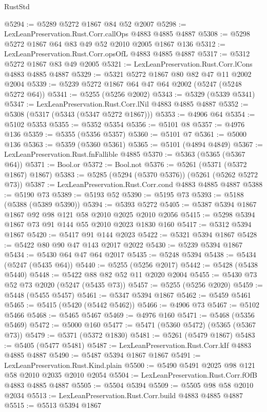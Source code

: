 \begin{lexlean}{RustStd}
\begin{coremodule}
@5294 := @5289 @5272 @1867 @84 @52 @2007
@5298 := LexLeanPreservation.Rust.Corr.callOps @4883 @4885 @4887
@5308 := @5298 @5272 @1867 @64 @83 @49 @52 @2010 @2005 @1867 @136
@5312 := LexLeanPreservation.Rust.Corr.opsOfL @4883 @4885 @4887
@5317 := @5312 @5272 @1867 @83 @49 @2005
@5321 := LexLeanPreservation.Rust.Corr.lCons @4883 @4885 @4887
@5329 := @5321 @5272 @1867 @80 @82 @47 @11 @2002 @2004
@5339 := @5239 @5272 @1867 @64 @47 @64 @2002 (@5247 (@5248 @5272 @64))
@5341 := @5255 (@5256 @2002)
@5343 := @5329 (@5339 @5341)
@5347 := LexLeanPreservation.Rust.Corr.lNil @4883 @4885 @4887
@5352 := @5308 (@5317 (@5343 (@5347 @5272 @1867)))
@5353 := @4906 @64
@5354 := @5102 @5353
@5355 := @5352 @5354
@5356 := @5101 @8
@5357 := @4976 @136
@5359 := @5355 (@5356 @5357)
@5360 := @5101 @7
@5361 := @5000 @136
@5363 := @5359 (@5360 @5361)
@5365 := @5101 (@4894 @4849)
@5367 := LexLeanPreservation.Rust.fnFallible @4885
@5370 := @5363 (@5365 (@5367 @64))
@5371 := Bool.or
@5372 := Bool.not
@5376 := @5261 (@5371 (@5372 @1867) @1867)
@5383 := @5285 (@5294 (@5370 @5376)) (@5261 (@5262 @5272 @73))
@5387 := LexLeanPreservation.Rust.Corr.cond @4883 @4885 @4887
@5388 := @5190 @73
@5389 := @5193 @52
@5390 := @5195 @73
@5393 := @5188 (@5388 (@5389 @5390))
@5394 := @5393 @5272
@5405 := @5387 @5394 @1867 @1867 @92 @98 @121 @58 @2010 @2025 @2010 @2056
@5415 := @5298 @5394 @1867 @73 @91 @144 @55 @2010 @2023 @1830 @160
@5417 := @5312 @5394 @1867
@5420 := @5417 @91 @144 @2023
@5422 := @5321 @5394 @1867
@5428 := @5422 @80 @90 @47 @143 @2017 @2022
@5430 := @5239 @5394 @1867
@5434 := @5430 @64 @47 @64 @2017
@5435 := @5248 @5394
@5438 := @5434 (@5247 (@5435 @64))
@5440 := @5255 (@5256 @2017)
@5442 := @5428 (@5438 @5440)
@5448 := @5422 @88 @82 @52 @11 @2020 @2004
@5455 := @5430 @73 @52 @73 @2020 (@5247 (@5435 @73))
@5457 := @5255 (@5256 @2020)
@5459 := @5448 (@5455 @5457)
@5461 := @5347 @5394 @1867
@5462 := @5459 @5461
@5465 := @5415 (@5420 (@5442 @5462))
@5466 := @4906 @73
@5467 := @5102 @5466
@5468 := @5465 @5467
@5469 := @4976 @160
@5471 := @5468 (@5356 @5469)
@5472 := @5000 @160
@5477 := @5471 (@5360 @5472) (@5365 (@5367 @73))
@5479 := @5371 (@5372 @1830)
@5481 := @5261 (@5479 @1867)
@5483 := @5405 (@5477 @5481)
@5487 := LexLeanPreservation.Rust.Corr.kIf @4883 @4885 @4887
@5490 := @5487 @5394 @1867 @1867
@5491 := LexLeanPreservation.Rust.Kind.plain
@5500 := @5490 @5491 @2025 @98 @121 @58 @2010 @2035 @2010 @2054
@5504 := LexLeanPreservation.Rust.Corr.fOfB @4883 @4885 @4887
@5505 := @5504 @5394
@5509 := @5505 @98 @58 @2010 @2034
@5513 := LexLeanPreservation.Rust.Corr.build @4883 @4885 @4887
@5515 := @5513 @5394 @1867

\end{coremodule}
\end{lexlean}
